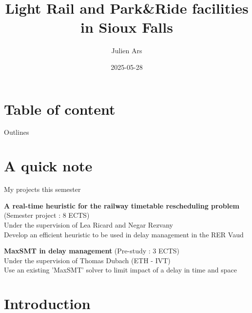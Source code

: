 \documentclass{EESD}
\author{Julien Ars}
\title[Light rail and P\&R facilities in Sioux Falls]{Light Rail and Park\&Ride facilities in Sioux Falls}
\institute[ENAC]{{\'Ecole Polytechnique F\'ed\'erale de Lausanne (EPFL)}{\newline\newline Civil Engineering}}
\date{2025-05-28}
\begin{document}
{ %
\usebackgroundtemplate{} %
} %



\section*{Table  of content}
\begin{frame}{Outlines}
\tableofcontents
\end{frame}

\section*{A quick note}
\begin{frame}{My projects this semester}
	\begin{itemize}
		\item \textbf{A real-time heuristic for the railway timetable rescheduling problem} (Semester project : 8 ECTS) \\
		Under the supervision of Lea Ricard and Negar Rezvany \\
		Develop an efficient heuristic to be used in delay management in the RER Vaud
		\textcolor{bg!75!normal text.fg}{\item  \textbf{MaxSMT in delay management} (Pre-study : 3 ECTS) \\
		Under the supervision of Thomas Dubach (ETH - IVT) \\
		Use an existing 'MaxSMT' solver to limit impact of a delay in time and space}
	\end{itemize}
\end{frame}



\section{Introduction}
\end{document}
